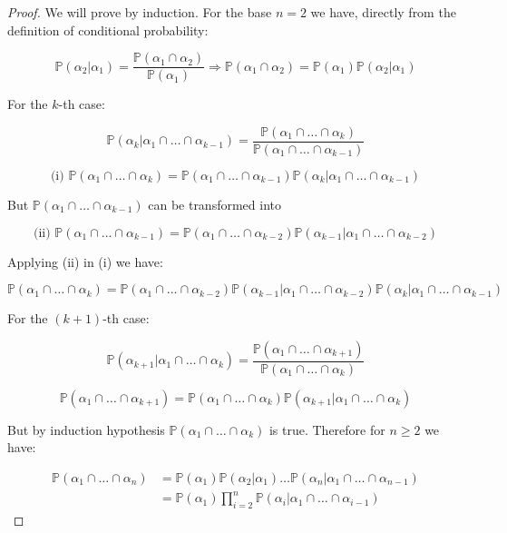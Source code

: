 \documentclass{amsart}
\theoremstyle{plain}
\newcommand{\pr}{\mathbb{P}}
\begin{document}
\begin{proof}
  We will prove by induction. For the base $n=2$ we have, directly from the definition of
  conditional probability:

  \begin{equation*}
    \pr(\alpha_2|\alpha_1)=\frac{\pr(\alpha_1\cap\alpha_2)}{\pr(\alpha_1)}\Rightarrow\pr(\alpha_1
    \cap\alpha_2)=\pr(\alpha_1)\pr(\alpha_2|\alpha_1)
  \end{equation*}

  For the $k$-th case:

  \begin{equation*}
    \pr(\alpha_k|\alpha_1\cap\ldots\cap\alpha_{k-1})=\frac{\pr(\alpha_1\cap\ldots\cap\alpha_k)}
    {\pr(\alpha_1\cap\ldots\cap\alpha_{k-1})}
  \end{equation*}

  \begin{equation*}
    \text{(i) }\pr(\alpha_1\cap\ldots\cap\alpha_k)=\pr(\alpha_1\cap\ldots\cap\alpha_{k-1})
      \pr(\alpha_k|\alpha_1\cap\ldots\cap\alpha_{k-1})
  \end{equation*}

  But $\pr(\alpha_1\cap\ldots\cap\alpha_{k-1})$ can be transformed into

  \begin{equation*}
    \text{(ii) }\pr(\alpha_1\cap\ldots\cap\alpha_{k-1})=\pr(\alpha_1\cap\ldots\cap\alpha_{k-2})
      \pr(\alpha_{k-1}|\alpha_1\cap\ldots\cap\alpha_{k-2})
  \end{equation*}

  Applying (ii) in (i) we have:

  \begin{equation*}
    \pr(\alpha_1\cap\ldots\cap\alpha_k)=\pr(\alpha_1\cap\ldots\cap\alpha_{k-2})\pr(\alpha_{k-1}|
      \alpha_1\cap\ldots\cap\alpha_{k-2})\pr(\alpha_k|\alpha_1\cap\ldots\cap\alpha_{k-1})
  \end{equation*}

  For the $(k+1)$-th case:

  \begin{equation*}
    \pr(\alpha_{k+1}|\alpha_1\cap\ldots\cap\alpha_k)=\frac{\pr(\alpha_1\cap\ldots\cap\alpha_{k+1})}
      {\pr(\alpha_1\cap\ldots\cap\alpha_k)}
  \end{equation*}

  \begin{equation*}
    \pr(\alpha_1\cap\ldots\cap\alpha_{k+1})=\pr(\alpha_1\cap\ldots\cap\alpha_k)\pr(\alpha_{k+1}|
      \alpha_1\cap\ldots\cap\alpha_k)
  \end{equation*}

  But by induction hypothesis $\pr(\alpha_1\cap\ldots\cap\alpha_k)$ is true. Therefore for $n\geq2$
  we have:

  \begin{align*}
    \pr(\alpha_1\cap\ldots\cap\alpha_n)&=\pr(\alpha_1)\pr(\alpha_2|\alpha_1)\ldots\pr(\alpha_n|
      \alpha_1\cap\ldots\cap\alpha_{n-1})\\
                                       &=\pr(\alpha_1)\prod_{i=2}^n\pr(\alpha_i|\alpha_1\cap\ldots
      \cap\alpha_{i-1})
  \end{align*}
\end{proof}
\end{document}
